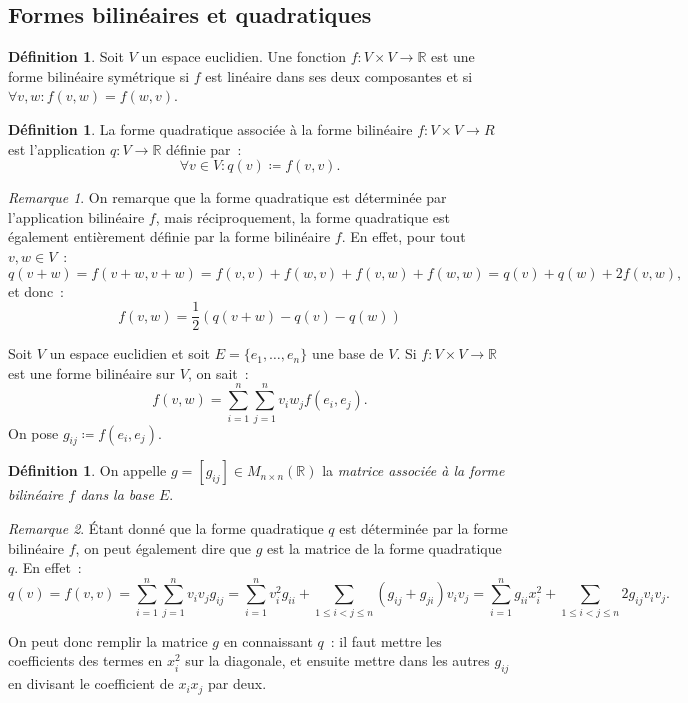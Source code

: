 \documentclass{article}
\newcommand{\R}{\mathbb R}
\newcommand{\M}[3]{M_{#1 \times #2}(#3)}
\theoremstyle{definition}
\newtheorem{déf}[thm]{Définition}
\theoremstyle{remark}
\newtheorem*{rmq}{Remarque}
\begin{document}
	\subsection{Formes bilinéaires et quadratiques}
		\begin{déf} Soit $V$ un espace euclidien. Une fonction $f : V \times V \to \R$ est une forme bilinéaire symétrique si $f$ est linéaire dans ses deux
		composantes et si $\forall v, w : f(v, w) = f(w, v)$.
		\end{déf}

		\begin{déf} La forme quadratique associée à la forme bilinéaire $f : V \times V \to R$ est l'application $q : V \to \R$ définie par~:
		\[\forall v \in V : q(v) \coloneqq f(v, v).\]
		\end{déf}

		\begin{rmq} On remarque que la forme quadratique est déterminée par l'application bilinéaire $f$, mais réciproquement, la forme quadratique est
		également entièrement définie par la forme bilinéaire $f$. En effet, pour tout $v, w \in V$~:
		\[q(v+w) = f(v+w, v+w) = f(v, v) + f(w, v) + f(v, w) + f(w, w) = q(v) + q(w) + 2f(v, w),\]
		et donc~:
		\[f(v, w) = \frac 12\left(q(v+w) - q(v) - q(w)\right)\]

		Soit $V$ un espace euclidien et soit $E = \{e_1, \dotsc, e_n\}$ une base de $V$. Si $f : V \times V \to \R$ est une forme bilinéaire sur $V$, on sait~:
		\[f(v, w) = \sum_{i=1}^n\sum_{j=1}^nv_iw_jf(e_i, e_j).\]
		On pose $g_{ij} \coloneqq f(e_i, e_j)$.
		\end{rmq}

		\begin{déf} On appelle $g = [g_{ij}] \in \M nn\R$ la \emph{matrice associée à la forme bilinéaire $f$ dans la base $E$}.
		\end{déf}

		\begin{rmq} Étant donné que la forme quadratique $q$ est déterminée par la forme bilinéaire $f$, on peut également dire que $g$ est la matrice de la
		forme quadratique $q$. En effet~:
		\[q(v) = f(v, v) = \sum_{i=1}^n\sum_{j=1}^nv_iv_jg_{ij} = \sum_{i=1}^nv_i^2g_{ii} + \sum_{1 \leq i < j \leq n}(g_{ij} + g_{ji})v_iv_j
		= \sum_{i=1}^ng_{ii}x_i^2 + \sum_{1 \leq i < j \leq n}2g_{ij}v_iv_j.\]

		On peut donc remplir la matrice $g$ en connaissant $q$~: il faut mettre les coefficients des termes en $x_i^2$ sur la diagonale, et ensuite mettre dans
		les autres $g_{ij}$ en divisant le coefficient de $x_ix_j$ par deux.
		\end{rmq}
\end{document}
